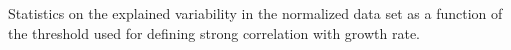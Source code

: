 
  Statistics on the explained variability in the normalized data set as a function of the threshold used for defining strong correlation with growth rate.
